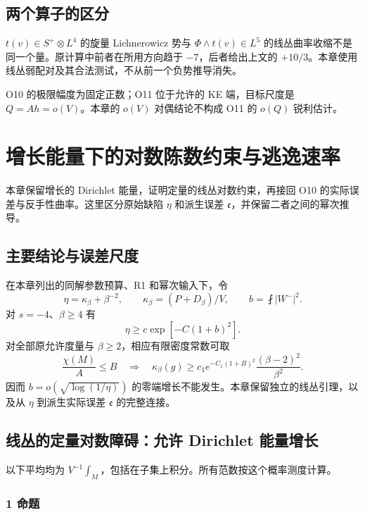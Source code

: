 \documentclass[UTF8,11pt,openany,oneside,fontset=none]{ctexbook}
\begin{document}
\section{两个算子的区分}\label{ch3:ux4e24ux4e2aux7b97ux5b50ux7684ux533aux5206}

\(t(v)\in S^+\otimes L^4\) 的旋量 Lichnerowicz 势与 \(\Phi\wedge t(v)\in L^5\) 的线丛曲率收缩不是同一个量。原计算中前者在所用方向趋于 \(-7\)，后者给出上文的 \(+10/3\)。本章使用线丛弱配对及其合法测试，不从前一个负势推导消失。

O10 的极限幅度为固定正数；O11 位于允许的 KE 端，目标尺度是 \(Q=Ah=o(V)\)。本章的 \(o(V)\) 对偶结论不构成 O11 的 \(o(Q)\) 锐利估计。


\chapter{增长能量下的对数陈数约束与逃逸速率}\label{chapter:4}
本章保留增长的 Dirichlet 能量，证明定量的线丛对数约束，再接回 O10 的实际误差与反手性曲率。这里区分原始缺陷 \(\eta\) 和派生误差 \(\mathfrak e\)，并保留二者之间的幂次推导。\cite{R04,Strong,FD}

\section{主要结论与误差尺度}\label{ch4:ux4e3bux8981ux7ed3ux8bbaux4e0eux8befux5deeux5c3aux5ea6}

在本章列出的同解参数预算、R1 和幂次输入下，令 \[
\eta=\kappa_\beta+\beta^{-2},\qquad
\kappa_\beta=(P+D_\beta)/V,\qquad b=\fint|W^-|^2.
\] 对 \(s=-4\)、\(\beta\ge4\) 有 \[
\eta\ge c\exp[-C(1+b)^2].\tag{4.1}\label{eq:r4:1}
\] 对全部原允许度量与 \(\beta\ge2\)，相应有限密度常数可取 \[
\frac{\chi(M)}A\le B\quad\Longrightarrow\quad
\kappa_\beta(g)\ge c_1e^{-C_1(1+B)^2}
\frac{(\beta-2)^2}{\beta^2}.\tag{4.2}\label{eq:r4:2}
\] 因而 \(b=o(\sqrt{\log(1/\eta)})\) 的零端增长不能发生。本章保留独立的线丛引理，以及从 \(\eta\) 到派生实际误差 \(\mathfrak e\) 的完整连接。

\section{线丛的定量对数障碍：允许 Dirichlet 能量增长}\label{ch4:ux7ebfux4e1bux7684ux5b9aux91cfux5bf9ux6570ux969cux788dux5141ux8bb8-dirichlet-ux80fdux91cfux589eux957f}

以下平均均为 \(V^{-1}\int_M\)，包括在子集上积分。所有范数按这个概率测度计算。

\subsection{1 命题}\label{ch4:ux547dux9898}
\end{document}
